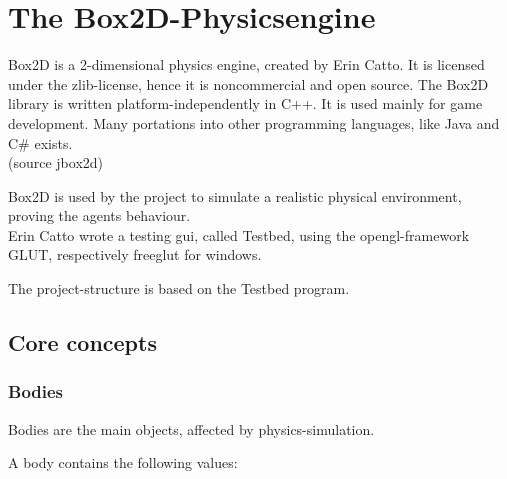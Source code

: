 \documentclass[10pt,a4paper,DIV=11]{scrreprt}
\begin{document}
\chapter{The Box2D-Physicsengine}
Box2D is a 2-dimensional physics engine, created by Erin Catto. It is licensed under the zlib-license, hence it is noncommercial and open source. The Box2D library is written platform-independently in C++. It is used mainly for game development. Many portations into other programming languages, like Java and C\# exists. \\
(source jbox2d)


Box2D is used by the project to simulate a realistic physical environment, proving the agents behaviour. \\

Erin Catto wrote a testing gui, called Testbed, using the opengl-framework GLUT, respectively freeglut for windows.

The project-structure is based on the Testbed program.


\section{Core concepts}

\subsection{Bodies}
Bodies are the main objects, affected by physics-simulation.

A body contains the following values: \\

   \\
\\
\end{document}
